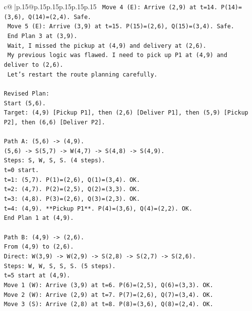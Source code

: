 \documentclass{article}
\begin{document}
{\begin{supertabular}{c@{$\;$}|p{.15\linewidth}@{}p{.15\linewidth}p{.15\linewidth}p{.15\linewidth}p{.15\linewidth}p{.15\linewidth}}
{{{\texttt{  Move 4 (E): Arrive (2,9) at t=14. P(14)=(3,6), Q(14)=(2,4). Safe.} \\
\texttt{  Move 5 (E): Arrive (3,9) at t=15. P(15)=(2,6), Q(15)=(3,4). Safe.} \\
\texttt{  End Plan 3 at (3,9).} \\
\texttt{  Wait, I missed the pickup at (4,9) and delivery at (2,6).} \\
\texttt{  My previous logic was flawed. I need to pick up P1 at (4,9) and deliver to (2,6).} \\
\texttt{  Let's restart the route planning carefully.} \\
\\ 
\texttt{Revised Plan:} \\
\texttt{Start (5,6).} \\
\texttt{Target: (4,9) {[}Pickup P1{]}, then (2,6) {[}Deliver P1{]}, then (5,9) {[}Pickup P2{]}, then (6,6) {[}Deliver P2{]}.} \\
\\ 
\texttt{Path A: (5,6) {-}> (4,9).} \\
\texttt{(5,6) {-}> S(5,7) {-}> W(4,7) {-}> S(4,8) {-}> S(4,9).} \\
\texttt{Steps: S, W, S, S. (4 steps).} \\
\texttt{t=0 start.} \\
\texttt{t=1: (5,7). P(1)=(2,6), Q(1)=(3,4). OK.} \\
\texttt{t=2: (4,7). P(2)=(2,5), Q(2)=(3,3). OK.} \\
\texttt{t=3: (4,8). P(3)=(2,6), Q(3)=(2,3). OK.} \\
\texttt{t=4: (4,9). **Pickup P1**. P(4)=(3,6), Q(4)=(2,2). OK.} \\
\texttt{End Plan 1 at (4,9).} \\
\\ 
\texttt{Path B: (4,9) {-}> (2,6).} \\
\texttt{From (4,9) to (2,6).} \\
\texttt{Direct: W(3,9) {-}> W(2,9) {-}> S(2,8) {-}> S(2,7) {-}> S(2,6).} \\
\texttt{Steps: W, W, S, S, S. (5 steps).} \\
\texttt{t=5 start at (4,9).} \\
\texttt{Move 1 (W): Arrive (3,9) at t=6. P(6)=(2,5), Q(6)=(3,3). OK.} \\
\texttt{Move 2 (W): Arrive (2,9) at t=7. P(7)=(2,6), Q(7)=(3,4). OK.} \\
\texttt{Move 3 (S): Arrive (2,8) at t=8. P(8)=(3,6), Q(8)=(2,4). OK.} \\
}}}
\end{supertabular}}
\end{document}
